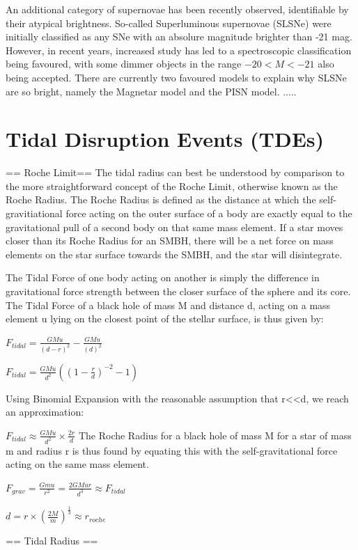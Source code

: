 An additional category of supernovae has been recently observed, identifiable by their atypical brightness. So-called Superluminous supernovae (SLSNe) were initially classified as any SNe with an absolure magnitude brighter than -21 mag. However, in recent years, increased study has led to a spectroscopic classification being favoured, with some dimmer objects in the range $-20 < M < -21$ also being accepted. There are currently two favoured models to explain why SLSNe are so bright, namely the Magnetar model and the PISN model. .....

\section{Tidal Disruption Events (TDEs)}
== Roche Limit==
The tidal radius can best be understood by comparison to the more straightforward concept of the Roche Limit, otherwise known as the Roche Radius. The Roche Radius is defined as the distance at which the self-gravitiational force acting on the outer surface of a body are exactly equal to the gravitational pull of a second body on that same mass element. If a star moves closer than its Roche Radius for an SMBH, there will be a net force on mass elements on the star surface towards the SMBH, and the star will disintegrate.

The Tidal Force of one body acting on another is simply the difference in gravitational force strength between the closer surface of the sphere and its core. The Tidal Force of a black hole of mass M and distance d, acting on a mass element u lying on the closest point of the stellar surface, is thus given by:

$F_{tidal} = \frac{GMu}{(d-r)^{2}} - \frac{GMu}{(d)^{2}}$

$F_{tidal} = \frac{GMu}{d^{2}}((1-\frac{r}{d})^{-2} - 1 )$

Using Binomial Expansion with the reasonable assumption that r<<d, we reach an approximation:

$F_{tidal} \approx \frac{GMu}{d^{2}}\times \frac{2r}{d}$
The Roche Radius for a black hole of mass M for a star of mass m and radius r is thus found by equating this with the self-gravitational force acting on the same mass element. 

$F_{grav} = \frac{Gmu}{r^{2}} = \frac{2GMur}{d^{3}} \approx F_{tidal}$

$ d = r \times (\frac{2M}{m})^{\frac{1}{3}} \approx r_{roche}$

== Tidal Radius ==

